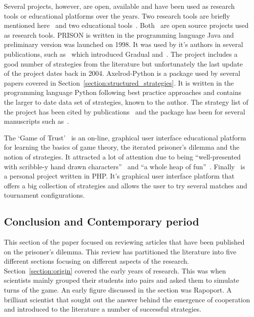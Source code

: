\documentclass{article}
\theoremstyle{definition}
\begin{document}
Several projects, however, are open, available and have been used as research
tools or educational platforms over the years. Two research tools are briefly mentioned
here~\cite{prison, axelrodproject} and two educational tools~\cite{pd_trust, pd_game}.
Both~\cite{prison, axelrodproject} are open source projects used as research
tools. PRISON is written in the programming language Java and preliminary version
was launched on 1998. It was used by it's authors in several publications, such
as~\cite{Beaufils1997} which introduced Gradual and~\cite{Beaufils1988}. The project
includes a good number of strategies from the literature but unfortunately the
last update of the project dates back in 2004.
Axelrod-Python is a package used by several papers covered in Section~\ref{section:structured_strategies}.
It is written in the programming language Python following best practice
approaches and contains the larger to date data set of strategies, known to the
author. The strategy
list of the project has been cited by publications~\cite{Anastassacos2018,
Hayes2017, Neumann2018} and the package has been for several manuscripts
such as~\cite{Goodman2018, Wang2017}.

The `Game of Trust'~\cite{pd_trust} is an on-line, graphical user interface
educational platform for learning the basics of game theory, the iterated prisoner's
dilemma and the notion of strategies. It attracted a lot of attention due to
being ``well-presented with scribble-y hand drawn characters''~\cite{trust_blogb}
and ``a whole heap of fun''~\cite{trust_bloga}. Finally~\cite{pd_game} is a
personal project written in PHP. It's graphical user interface platform that offers
a big collection of strategies and allows the user to try several matches and
tournament configurations.

\subsection{Conclusion and Contemporary period}\label{section:contemporary_period}

This section of the paper focused on reviewing articles that have been
published on the prisoner's dilemma. This review has partitioned the literature
into five different sections focusing on different aspects of the research.
Section~\ref{section:origin} covered the early years of research. This was when scientists
mainly grouped their students into pairs and asked them to simulate turns of
the game. An early figure discussed in the section was Rapoport. A brilliant
scientist that sought out the answer behind the emergence of cooperation and
introduced to the literature a number of successful strategies.
\end{document}
